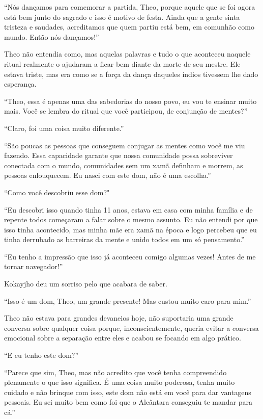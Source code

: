 ``Nós dançamos para comemorar a partida, Theo, porque aquele que se foi
agora está bem junto do sagrado e isso é motivo de festa. Ainda que a
gente sinta tristeza e saudades, acreditamos que quem partiu está bem,
em comunhão como mundo. Então nós dançamos!''

Theo não entendia como, mas aquelas palavras e tudo o que aconteceu
naquele ritual realmente o ajudaram a ficar bem diante da morte de seu
mestre. Ele estava triste, mas era como se a força da dança daqueles
índios tivessem lhe dado esperança.

``Theo, essa é apenas uma das sabedorias do nosso povo, eu vou te
ensinar muito mais. Você se lembra do ritual que você participou, de
conjunção de mentes?''

``Claro, foi uma coisa muito diferente.''

``São poucas as pessoas que conseguem conjugar as mentes como você me
viu fazendo. Essa capacidade garante que nossa comunidade possa
sobreviver conectada com o mundo, comunidades sem um xamã definham e
morrem, as pessoas enlouquecem. Eu nasci com este dom, não é uma
escolha.''

``Como você descobriu esse dom?"

``Eu descobri isso quando tinha 11 anos, estava em casa com minha
família e de repente todos começaram a falar sobre o mesmo assunto. Eu
não entendi por que isso tinha acontecido, mas minha mãe era xamã na
época e logo percebeu que eu tinha derrubado as barreiras da mente e
unido todos em um só pensamento.''

``Eu tenho a impressão que isso já aconteceu comigo algumas vezes! Antes
de me tornar navegador!''

Kokayjho deu um sorriso pelo que acabara de saber.

``Isso é um dom, Theo, um grande presente! Mas custou muito caro para
mim.''

Theo não estava para grandes devaneios hoje, não suportaria uma grande
conversa sobre qualquer coisa porque, inconscientemente, queria evitar a
conversa emocional sobre a separação entre eles e acabou se focando em
algo prático.

``E eu tenho este dom?''

``Parece que sim, Theo, mas não acredito que você tenha compreendido
plenamente o que isso significa. É uma coisa muito poderosa, tenha muito
cuidado e não brinque com isso, este dom não está em você para dar
vantagens pessoais. Eu sei muito bem como foi que o Alcântara conseguiu
te mandar para cá.''

